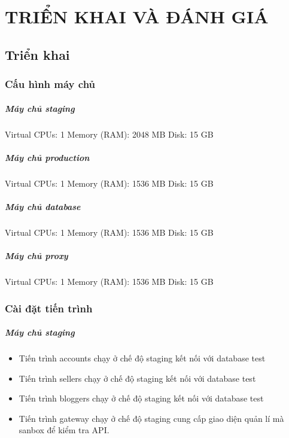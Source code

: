 
\chapter{TRIỂN KHAI VÀ ĐÁNH GIÁ}\label{section:dev}

\section{Triển khai}

\subsection{Cấu hình máy chủ}

\paragraph{Máy chủ staging}
Virtual CPUs: 1
Memory (RAM): 2048 MB
Disk: 15 GB

\paragraph{Máy chủ production}
Virtual CPUs: 1
Memory (RAM): 1536 MB
Disk: 15 GB

\paragraph{Máy chủ database}
Virtual CPUs: 1
Memory (RAM): 1536 MB
Disk: 15 GB

\paragraph{Máy chủ proxy}
Virtual CPUs: 1
Memory (RAM): 1536 MB
Disk: 15 GB

\subsection{Cài đặt tiến trình}


\paragraph{Máy chủ staging}
\begin{itemize}
	\item Tiến trình accounts chạy ở chế độ staging kết nối với database test
	\item Tiến trình sellers chạy ở chế độ staging kết nối với database test
	\item Tiến trình bloggers chạy ở chế độ staging kết nối với database test
	\item Tiến trình gateway chạy ở chế độ staging cung cấp giao diện quản lí mà sanbox để kiểm tra API.
\end{itemize}

